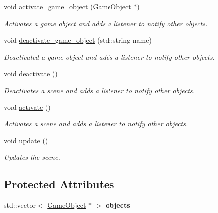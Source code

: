 \begin{DoxyCompactItemize}
\item 
void \hyperlink{classengine_1_1_scene_af63b3b770464494c0cdb56a7a13b50fb}{activate\+\_\+game\+\_\+object} (\hyperlink{classengine_1_1_game_object}{Game\+Object} $\ast$)
\begin{DoxyCompactList}\small\item\em Activates a game object and adds a listener to notify other objects. \end{DoxyCompactList}\item 
void \hyperlink{classengine_1_1_scene_af9c8a6de10c3d49300183f68cefadb39}{deactivate\+\_\+game\+\_\+object} (std\+::string name)
\begin{DoxyCompactList}\small\item\em Deactivated a game object and adds a listener to notify other objects. \end{DoxyCompactList}\item 
void \hyperlink{classengine_1_1_scene_ad8fa30fc96100daf9f028922bb435daa}{deactivate} ()
\begin{DoxyCompactList}\small\item\em Deactivates a scene and adds a listener to notify other objects. \end{DoxyCompactList}\item 
void \hyperlink{classengine_1_1_scene_adf671a288f878e3efa42ccbf34b0d6ed}{activate} ()
\begin{DoxyCompactList}\small\item\em Activates a scene and adds a listener to notify other objects. \end{DoxyCompactList}\item 
void \hyperlink{classengine_1_1_scene_aa24c7e636c10e4e42650c1374b90bb80}{update} ()
\begin{DoxyCompactList}\small\item\em Updates the scene. \end{DoxyCompactList}\end{DoxyCompactItemize}
\subsection*{Protected Attributes}
\begin{DoxyCompactItemize}
\item 
std\+::vector$<$ \hyperlink{classengine_1_1_game_object}{Game\+Object} $\ast$ $>$ {\bfseries objects}\hypertarget{classengine_1_1_scene_a96bc55879afea7cb0086df8172b3bc09}{}\label{classengine_1_1_scene_a96bc55879afea7cb0086df8172b3bc09}

\end{DoxyCompactItemize}


